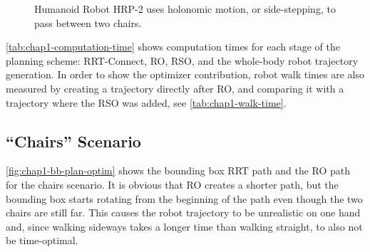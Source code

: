 \begin{figure}
  \caption{Humanoid Robot HRP-2 uses holonomic motion, or
    side-stepping, to pass between two chairs.}
  \label{fig:chap1-hrp2-chairs}
\end{figure}

\ref{tab:chap1-computation-time} shows computation times for each
stage of the planning scheme: RRT-Connect, RO, RSO, and the whole-body
robot trajectory generation. In order to show the optimizer
contribution, robot walk times are also measured by creating a
trajectory directly after RO, and comparing it with a trajectory where
the RSO was added, see \autoref{tab:chap1-walk-time}.

\subsection{``Chairs'' Scenario}
\label{subsec:chap1-chairs}

\autoref{fig:chap1-bb-plan-optim} shows the bounding box RRT path
and the RO path for the chairs scenario. It is obvious that RO creates
a shorter path, but the bounding box starts rotating from the
beginning of the path even though the two chairs are still far. This
causes the robot trajectory to be unrealistic on one hand and, since
walking sideways takes a longer time than walking straight, to also
not be time-optimal.

